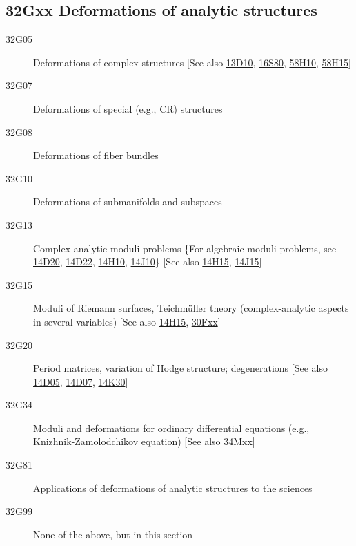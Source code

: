 \documentclass[letterpaper]{article}
\begin{document}
\subsection*{32Gxx  Deformations of analytic structures }\label{32Gxx}
\begin{description}  
\item [32G05]\label{32G05} Deformations of complex structures [See also \hyperref[13D10]{13D10}, \hyperref[16S80]{16S80}, \hyperref[58H10]{58H10}, \hyperref[58H15]{58H15}]
\item [32G07]\label{32G07} Deformations of special (e.g., CR) structures
\item [32G08]\label{32G08} Deformations of fiber bundles
\item [32G10]\label{32G10} Deformations of submanifolds and subspaces
\item [32G13]\label{32G13} Complex-analytic moduli problems \{For algebraic moduli problems, see \hyperref[14D20]{14D20}, \hyperref[14D22]{14D22}, \hyperref[14H10]{14H10}, \hyperref[14J10]{14J10}\} [See also \hyperref[14H15]{14H15}, \hyperref[14J15]{14J15}]
\item [32G15]\label{32G15} Moduli of Riemann surfaces, Teichm\"{u}ller theory (complex-analytic aspects in several variables) [See also \hyperref[14H15]{14H15}, \hyperref[30Fxx]{30Fxx}]
\item [32G20]\label{32G20} Period matrices, variation of Hodge structure; degenerations [See also \hyperref[14D05]{14D05}, \hyperref[14D07]{14D07}, \hyperref[14K30]{14K30}]
\item [32G34]\label{32G34} Moduli and deformations for ordinary differential equations (e.g., Knizhnik-Zamolodchikov equation) [See also \hyperref[34Mxx]{34Mxx}]
\item [32G81]\label{32G81} Applications of deformations of analytic structures to the sciences
\item [32G99]\label{32G99} None of the above, but in this section
\end{description}
\end{document}
